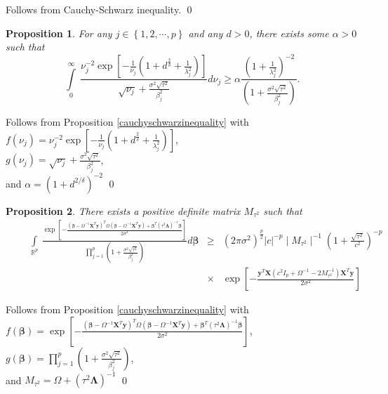 \documentclass[noinfoline,11pt]{imsart}
\numberwithin{equation}{section}
\theoremstyle{plain}
\newtheorem{prop}{Proposition}[section]
\newcommand{\y}{\mathbf{y}}
\newcommand{\X}{\mathbf{X}}
\newcommand{\bb}{\boldsymbol{\beta}}
\newcommand{\Bl}{\boldsymbol{\Lambda}}
\begin{document}
\proof Follows from Cauchy-Schwarz inequality. \qed

\begin{prop}\label{integralwrtnureghorseshoe}
For any $j\in\left\{1,2,\cdots,p\right\}$ and any $d>0$, there exists some $\alpha>0$ such that
$$\displaystyle\int\limits_0^\infty\ \frac{\nu_j^{-2}\exp{\left[-\frac{1}{\nu_j}\left(1+d^{\frac{2}{\delta}}+\frac{1}{\lambda_j^2}\right)\right]}}{\sqrt{\nu_j}+\frac{\sigma^2\sqrt{\tau^2}}{\beta_j^2}}d\nu_j\geq \alpha\frac{\left(1+\frac{1}{\lambda_j^2}\right)^{-2}}{\left(1+\frac{\sigma^2\sqrt{\tau^2}}{\beta_j^2}\right)}.$$ 
\end{prop}

\proof Follows from Proposition \ref{cauchyschwarzinequality} with \\

$f\left(\nu_j\right)=\nu_j^{-2}\exp{\left[-\frac{1}{\nu_j}\left(1+d^{\frac{2}{\delta}}+\frac{1}{\lambda_j^2}\right)\right]}$, \\
$g\left(\nu_j\right)=\sqrt{\nu_j}+\frac{\sigma^2\sqrt{\tau^2}}{\beta_j^2}$, \\
and $\alpha=\left(1+d^{2/\delta}\right)^{-2}$ \qed


\begin{prop} \label{integralwrtbetareghorseshoe} There exists a positive definite matrix $M_{\tau^2}$ such that \\
\begin{align*}
\qquad \displaystyle\int\limits_{\mathbb{R}^p}\ \frac{\exp{\left[-\frac{\left(\bb-\Omega^{-1}\X^T\y\right)^T \Omega\left(\bb-\Omega^{-1}\X^T\y\right)+\bb^T\left(\tau^2\Bl\right)^{-1}\bb}{2\sigma^2}\right]}}{\prod\limits_{j=1}^p\left(1+\frac{\sigma^2\sqrt{\tau^2}}{\beta_j^2}\right)}d\bb &\geq&  \left(2\pi\sigma^2\right)^{\frac{p}{2}}|c|^{-p}\mid M_{\tau^2}\mid^{-1}\left(1+\frac{\sqrt{\tau^2}}{c^2}\right)^{-p} \\
 \qquad \qquad &\times&\exp{\left[-\frac{\y^T\X\left(c^2I_p+\Omega^{-1}-2M_{\tau^2}^{-1}\right)\X^T\y}{2\sigma^2}\right]}
\end{align*}
\end{prop}

\proof Follows from Proposition \ref{cauchyschwarzinequality} with \\

$f\left(\bb\right)=\exp{\left[-\frac{\left(\bb-\Omega^{-1}\X^T\y\right)^T \Omega\left(\bb-\Omega^{-1}\X^T\y\right)+\bb^T\left(\tau^2\Bl\right)^{-1}\bb}{2\sigma^2}\right]}$, \\ $g\left(\bb\right)=\prod\limits_{j=1}^p\left(1+\frac{\sigma^2\sqrt{\tau^2}}{\beta_j^2}\right)$, \\ and $M_{\tau^2}=\Omega+\left(\tau^2\Bl\right)^{-1}$ \qed
\end{document}

